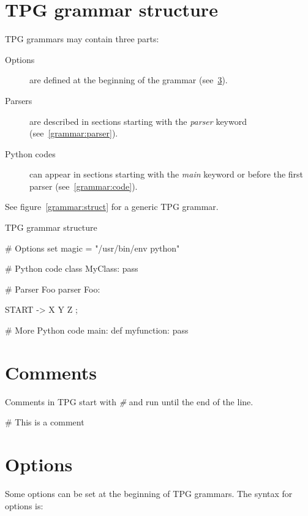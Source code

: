 \section{TPG grammar structure}

TPG grammars may contain three parts:

\begin{description}
	\item [Options]
		are defined at the beginning of the grammar (see~\ref{grammar:options}).
	\item [Parsers]
		are described in sections starting with the \emph{parser} keyword (see~\ref{grammar:parser}).
	\item [Python codes]
		can appear in sections starting with the \emph{main} keyword or before the first parser (see~\ref{grammar:code}).
\end{description}

See figure~\ref{grammar:struct} for a generic TPG grammar.

\begin{code}
\caption{TPG grammar structure}								\label{grammar:struct}
\begin{verbatimtab}[4]
# Options
set magic = "/usr/bin/env python"

# Python code
{{
	class MyClass:
		pass
}}

# Parser Foo
parser Foo:

	START -> X Y Z ;

# More Python code
main:
{{
	def myfunction:
		pass
}}
\end{verbatimtab}
\end{code}

\section{Comments}

Comments in TPG start with \emph{\#} and run until the end of the line.

\begin{verbatimtab}[4]
	# This is a comment
\end{verbatimtab}

\section{Options}											\label{grammar:options}

Some options can be set at the beginning of TPG grammars.
The syntax for options is:


